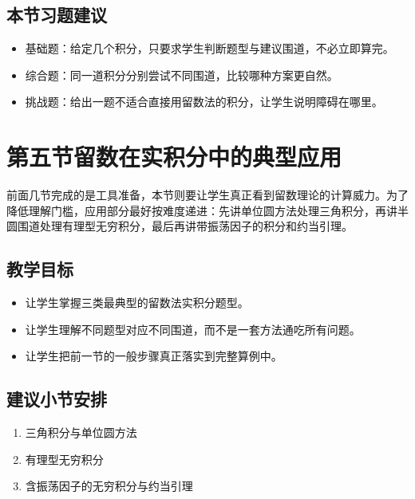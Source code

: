 \subsection*{本节习题建议}
\begin{itemize}
    \item 基础题：给定几个积分，只要求学生判断题型与建议围道，不必立即算完。
    \item 综合题：同一道积分分别尝试不同围道，比较哪种方案更自然。
    \item 挑战题：给出一题不适合直接用留数法的积分，让学生说明障碍在哪里。
\end{itemize}

\section{第五节\quad 留数在实积分中的典型应用}

\begin{wulibj}[本节要解决的问题]
前面几节完成的是工具准备，本节则要让学生真正看到留数理论的计算威力。为了降低理解门槛，应用部分最好按难度递进：先讲单位圆方法处理三角积分，再讲半圆围道处理有理型无穷积分，最后再讲带振荡因子的积分和约当引理。
\end{wulibj}

\subsection*{教学目标}
\begin{itemize}
    \item 让学生掌握三类最典型的留数法实积分题型。
    \item 让学生理解不同题型对应不同围道，而不是一套方法通吃所有问题。
    \item 让学生把前一节的一般步骤真正落实到完整算例中。
\end{itemize}

\subsection*{建议小节安排}
\begin{enumerate}
    \item 三角积分与单位圆方法
    \item 有理型无穷积分
    \item 含振荡因子的无穷积分与约当引理
\end{enumerate}

